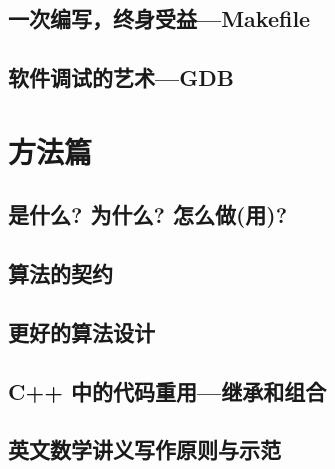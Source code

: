 \documentclass[a4paper,oneside]{report}
\begin{document}
\begin{CJK*}{UTF8}{gkai}
\section{一次编写，终身受益---Makefile}
\label{sec:make}


\section{软件调试的艺术---GDB}
\label{sec:gdb}




\chapter{方法篇}

\section{是什么? 为什么? 怎么做(用)?}
\label{sec:WhatWhyHow}


\section{算法的契约}
\label{sec:contract}


\section{更好的算法设计}
\label{sec:designAlgo}


\section{C++ 中的代码重用---继承和组合}
\label{sec:reuse}


\section{英文数学讲义写作原则与示范}
\label{sec:writeNotes}


 
{\footnotesize


}



\end{CJK*}
\end{document}
